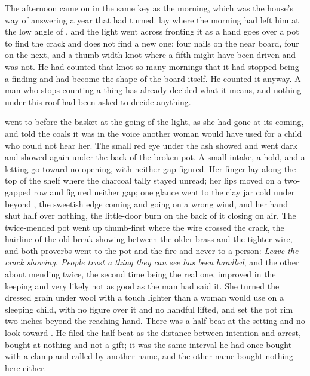 The afternoon came on in the same key as the morning, which was the house's way of answering a year that had turned.  lay where the morning had left him at the low angle of , and the light went across  fronting it as a hand goes over a pot to find the crack and does not find a new one: four nails on the near board, four on the next, and a thumb-width knot where a fifth might have been driven and was not. He had counted that knot so many mornings that it had stopped being a finding and had become the shape of the board itself. He counted it anyway. A man who stops counting a thing has already decided what it means, and nothing under this roof had been asked to decide anything.

 went to  before the basket at the going of the light, as she had gone at its coming, and told the coals it was  in the voice another woman would have used for a child who could not hear her. The small red eye under the ash showed and went dark and showed again under the back of the broken pot. A small intake, a hold, and a letting-go toward no opening, with neither gap figured. Her finger lay along the top of the shelf where the charcoal tally stayed unread; her lips moved on a two-gapped row and figured neither gap; one glance went to the clay jar cold under  beyond , the sweetish edge coming and going on a wrong wind, and her hand shut half over nothing, the little-door burn on the back of it closing on air. The twice-mended pot went up thumb-first where the wire crossed the crack, the hairline of the old break showing between the older brass and the tighter wire, and both proverbs went to the pot and the fire and never to a person: \emph{Leave the crack showing. People trust a thing they can see has been handled}, and the other about mending twice, the second time being the real one, improved in the keeping and very likely not as good as the man had said it. She turned the dressed grain under wool with a touch lighter than a woman would use on a sleeping child, with no figure over it and no handful lifted, and set the pot rim two inches beyond the reaching hand. There was a half-beat at the setting and no look toward . He filed the half-beat as the distance between intention and arrest, bought at nothing and not a gift; it was the same interval he had once bought with a clamp and called by another name, and the other name bought nothing here either.

